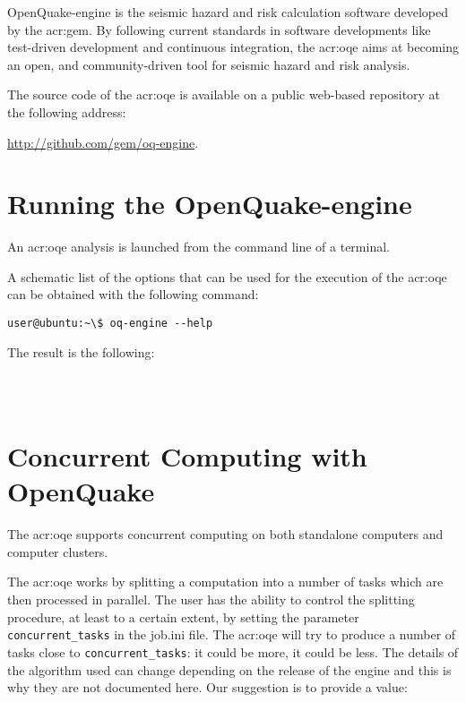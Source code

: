 OpenQuake-engine is the seismic hazard and risk calculation software developed by
the \glsdesc{acr:gem}. By following current standards in software
developments like test-driven development and continuous integration, the
\glsdesc{acr:oqe} aims at becoming an open, and community-driven tool for
seismic hazard and risk analysis.

The source code of the \glsdesc{acr:oqe} is available on a public web-based
repository at the following address:

\href{http://github.com/gem/oq-engine}{http://github.com/gem/oq-engine}.


\section{Running the OpenQuake-engine}
\label{sec:running_oq_engine}

An \gls{acr:oqe} analysis is launched from the command line of a terminal.

A schematic list of the options that can be used for the execution of the
\gls{acr:oqe} can be obtained with the following command:

\begin{verbatim}
user@ubuntu:~\$ oq-engine --help
\end{verbatim}

The result is the following:

\inputminted[firstline=1,fontsize=\footnotesize,frame=single]{shell-session}{oqum/help.txt}\\

\section{Concurrent Computing with OpenQuake}
\label{sec:concurrent_tasks}

The \glsdesc{acr:oqe} supports concurrent computing on both standalone
computers and computer clusters.

The \glsdesc{acr:oqe} works by splitting a computation into a number of tasks
which are then processed in parallel. The user has the ability to control the
splitting procedure, at least to a certain extent, by setting the parameter
\Verb+concurrent_tasks+ in the job.ini file. The \glsdesc{acr:oqe} will try to
produce a number of tasks close to \Verb+concurrent_tasks+: it could be more, it
could be less. The details of the algorithm used can change depending on the
release of the engine and this is why they are not documented here. Our
suggestion is to provide a value:

